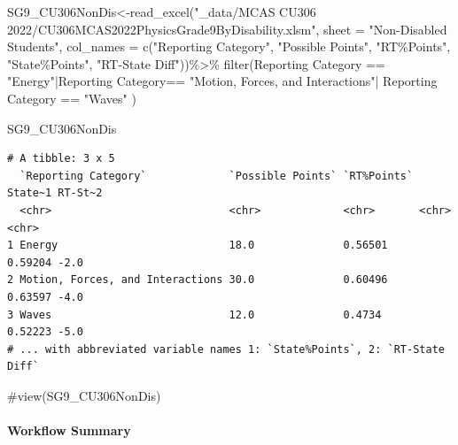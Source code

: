 \documentclass[
  letterpaper,
  DIV=11,
  numbers=noendperiod]{scrartcl}
\let\oldparagraph\paragraph
\renewcommand{\paragraph}[1]{\oldparagraph{#1}\mbox{}}
\newenvironment{Shaded}{\begin{snugshade}}{\end{snugshade}}
\newcommand{\AttributeTok}[1]{\textcolor[rgb]{0.40,0.45,0.13}{#1}}
\newcommand{\CommentTok}[1]{\textcolor[rgb]{0.37,0.37,0.37}{#1}}
\newcommand{\FunctionTok}[1]{\textcolor[rgb]{0.28,0.35,0.67}{#1}}
\newcommand{\NormalTok}[1]{\textcolor[rgb]{0.00,0.23,0.31}{#1}}
\newcommand{\OtherTok}[1]{\textcolor[rgb]{0.00,0.23,0.31}{#1}}
\newcommand{\SpecialCharTok}[1]{\textcolor[rgb]{0.37,0.37,0.37}{#1}}
\newcommand{\StringTok}[1]{\textcolor[rgb]{0.13,0.47,0.30}{#1}}
\begin{document}
\begin{Shaded}
\begin{Highlighting}[]
\NormalTok{SG9\_CU306NonDis}\OtherTok{\textless{}{-}}\FunctionTok{read\_excel}\NormalTok{(}\StringTok{"\_data/MCAS CU306 2022/CU306MCAS2022PhysicsGrade9ByDisability.xlsm"}\NormalTok{, }
  \AttributeTok{sheet =} \StringTok{"Non{-}Disabled Students"}\NormalTok{, }
   \AttributeTok{col\_names =} \FunctionTok{c}\NormalTok{(}\StringTok{"Reporting Category"}\NormalTok{, }\StringTok{"Possible Points"}\NormalTok{, }\StringTok{"RT\%Points"}\NormalTok{,}
                \StringTok{"State\%Points"}\NormalTok{, }\StringTok{"RT{-}State Diff"}\NormalTok{))}\SpecialCharTok{\%\textgreater{}\%}
  \FunctionTok{filter}\NormalTok{(}\StringTok{\textasciigrave{}}\AttributeTok{Reporting Category}\StringTok{\textasciigrave{}} \SpecialCharTok{==} \StringTok{"Energy"}\SpecialCharTok{|}\StringTok{\textasciigrave{}}\AttributeTok{Reporting Category}\StringTok{\textasciigrave{}}\SpecialCharTok{==} \StringTok{"Motion, Forces, and Interactions"}\SpecialCharTok{|} \StringTok{\textasciigrave{}}\AttributeTok{Reporting Category}\StringTok{\textasciigrave{}} \SpecialCharTok{==} \StringTok{"Waves"}\NormalTok{ )}

\NormalTok{SG9\_CU306NonDis}
\end{Highlighting}
\end{Shaded}

\begin{verbatim}
# A tibble: 3 x 5
  `Reporting Category`             `Possible Points` `RT%Points` State~1 RT-St~2
  <chr>                            <chr>             <chr>       <chr>   <chr>  
1 Energy                           18.0              0.56501     0.59204 -2.0   
2 Motion, Forces, and Interactions 30.0              0.60496     0.63597 -4.0   
3 Waves                            12.0              0.4734      0.52223 -5.0   
# ... with abbreviated variable names 1: `State%Points`, 2: `RT-State Diff`
\end{verbatim}

\begin{Shaded}
\begin{Highlighting}[]
\CommentTok{\#view(SG9\_CU306NonDis)}
\end{Highlighting}
\end{Shaded}

\hypertarget{workflow-summary}{%
\paragraph{Workflow Summary}\label{workflow-summary}}
\end{document}

